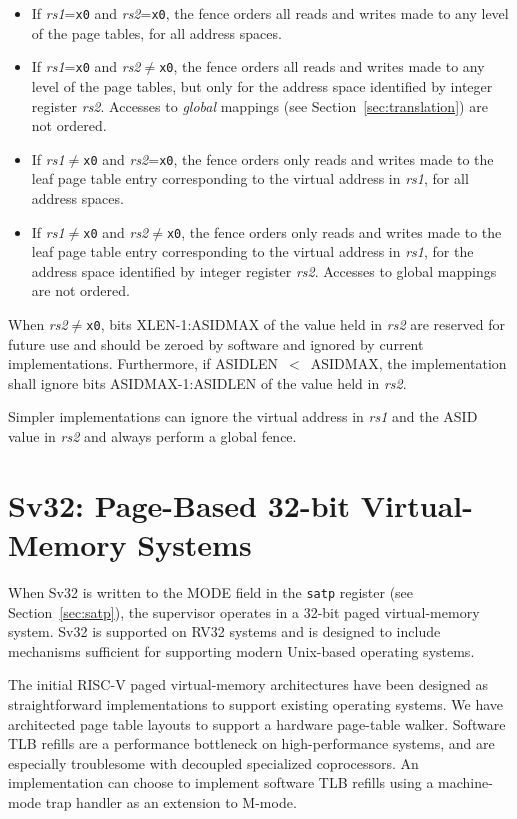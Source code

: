 \begin{itemize}
\item If {\em rs1}={\tt x0} and {\em rs2}={\tt x0}, the fence orders all
      reads and writes made to any level of the page tables, for all
      address spaces.
\item If {\em rs1}={\tt x0} and {\em rs2}$\neq${\tt x0}, the fence orders
      all reads and writes made to any level of the page tables, but only
      for the address space identified by integer register {\em rs2}.
      Accesses to {\em global} mappings (see Section~\ref{sec:translation})
      are not ordered.
\item If {\em rs1}$\neq${\tt x0} and {\em rs2}={\tt x0}, the fence orders
      only reads and writes made to the leaf page table entry corresponding
      to the virtual address in {\em rs1}, for all address spaces.
\item If {\em rs1}$\neq${\tt x0} and {\em rs2}$\neq${\tt x0}, the fence
      orders only reads and writes made to the leaf page table entry
      corresponding to the virtual address in {\em rs1}, for the address
      space identified by integer register {\em rs2}.
      Accesses to global mappings are not ordered.
\end{itemize}

When {\em rs2}$\neq${\tt x0}, bits XLEN-1:ASIDMAX of the value held in {\em
rs2} are reserved for future use and should be zeroed by software and ignored
by current implementations.  Furthermore, if ASIDLEN~$<$~ASIDMAX, the
implementation shall ignore bits ASIDMAX-1:ASIDLEN of the value held in {\em
rs2}.

\begin{commentary}
Simpler implementations can ignore the virtual address in {\em rs1} and
the ASID value in {\em rs2} and always perform a global fence.
\end{commentary}

\section{Sv32: Page-Based 32-bit Virtual-Memory Systems}
\label{sec:sv32}

When Sv32 is written to the MODE field in the {\tt satp} register
(see Section~\ref{sec:satp}),
the supervisor operates in a 32-bit paged virtual-memory system.  Sv32
is supported on RV32 systems and is designed to include mechanisms
sufficient for supporting modern Unix-based operating systems.

\begin{commentary}
The initial RISC-V paged virtual-memory architectures have been
designed as straightforward implementations to support existing
operating systems.  We have architected page table layouts to support
a hardware page-table walker.  Software TLB refills are a performance
bottleneck on high-performance systems, and are especially troublesome
with decoupled specialized coprocessors.  An implementation can choose
to implement software TLB refills using a machine-mode trap handler as
an extension to M-mode.
\end{commentary}

